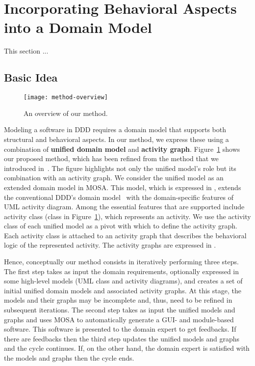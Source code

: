 \section{Incorporating Behavioral Aspects into a Domain Model}
\label{sect:incorporateDomainBehavior}

This section ...

\subsection{Basic Idea}

\begin{figure}[ht]
\begin{center}
\texttt{[image: method-overview]}
\end{center}
\caption{An overview of our method.} %
\label{fig:method-overview}
\end{figure}

Modeling a software in DDD requires a domain model that supports both structural and behavioral aspects.
%
In our method, we express these using a combination of \textbf{unified domain model} and \textbf{activity graph}.
%
Figure~\ref{fig:method-overview} shows our proposed method, which has been refined from the method that we introduced in~\cite{le_domain_2018}. 
The figure highlights not only the unified model's role but its combination with an activity graph. 
We consider the unified model as an extended domain model in MOSA. This model, which is expressed in \dcsl, extends the conventional DDD's domain model~\cite{evans_domain-driven_2004} with the domain-specific features of UML activity diagram. Among the essential features that are supported include activity class (\eg class  in Figure~\ref{fig:method-overview}), which represents an activity. We use the activity class of each unified model as a pivot with which to define the activity graph. Each activity class is attached to an activity graph that describes the behavioral logic of the represented activity. The activity graphs are expressed in \agl.

Hence, conceptually our method consists in iteratively performing three steps. The first step takes as input the domain requirements, optionally expressed in some high-level models (\eg UML class and activity diagrams), and creates a set of initial unified domain models and associated activity graphs. At this stage, the models and their graphs may be incomplete and, thus, need to be refined in subsequent iterations. The second step takes as input the unified models and graphs and uses MOSA to automatically generate a GUI- and module-based software. This software is presented to the domain expert to get feedbacks. If there are feedbacks then the third step updates the unified models and graphs and the cycle continues. If, on the other hand, the domain expert is satisfied with the models and graphs then the cycle ends.

